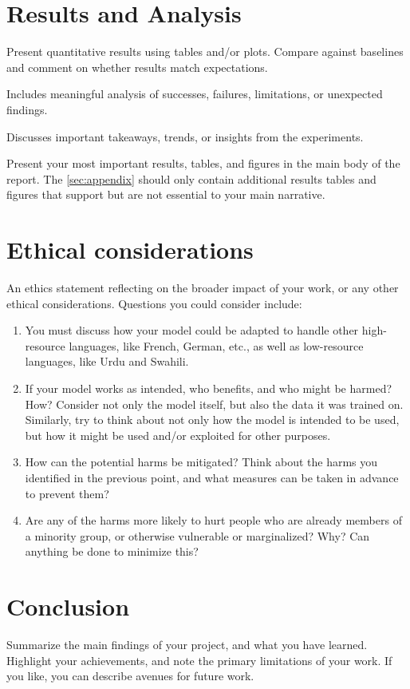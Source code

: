 \documentclass[11pt]{article}
\begin{document}
\section{Results and Analysis}
Present quantitative results using tables and/or plots. Compare against baselines and comment on whether results match expectations.

Includes meaningful analysis of successes, failures, limitations, or unexpected findings.

Discusses important takeaways, trends, or insights from the experiments.


Present your most important results, tables, and figures in the main body of the report. The \autoref{sec:appendix} should only contain additional results tables and figures that support but are not essential to your main narrative.


\section{Ethical considerations}
An ethics statement reflecting on the broader impact of your work, or any other ethical considerations. Questions you could consider include:
\begin{enumerate}
    \item You must discuss how your model could be adapted to handle other high-resource languages, like French, German, etc., as well as low-resource languages, like Urdu and Swahili.
    \item If your model works as intended, who benefits, and who might be harmed? How? Consider not only the model itself, but also the data it was trained on. Similarly, try to think about not only how the model is intended to be used, but how it might be used and/or exploited for other purposes.
    \item How can the potential harms be mitigated? Think about the harms you identified in the previous point, and what measures can be taken in advance to prevent them?
    \item Are any of the harms more likely to hurt people who are already members of a minority group, or otherwise vulnerable or marginalized? Why? Can anything be done to minimize this?
\end{enumerate}



\section{Conclusion}
Summarize the main findings of your project, and what you have learned. Highlight your achievements, and note the primary limitations of your work. If you like, you can describe avenues for future work.
\end{document}
